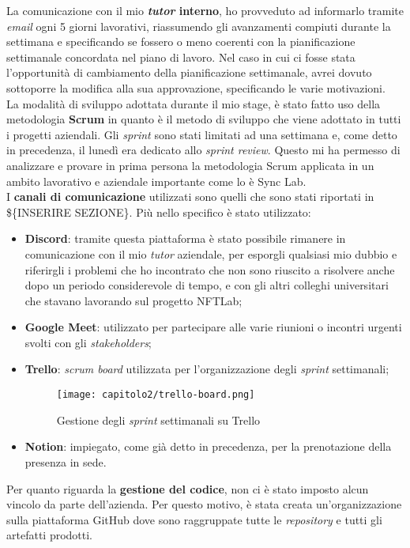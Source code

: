 La comunicazione con il mio \textbf{\emph{tutor} interno}, ho provveduto ad informarlo tramite \emph{email} ogni 5 giorni lavorativi, riassumendo gli avanzamenti compiuti durante la settimana e specificando se fossero o meno coerenti con la pianificazione settimanale concordata nel piano di lavoro. Nel caso in cui ci fosse stata l'opportunità di cambiamento della pianificazione settimanale, avrei dovuto sottoporre la modifica alla sua approvazione, specificando le varie motivazioni. \\

La modalità di sviluppo adottata durante il mio stage, è stato fatto uso della metodologia \textbf{Scrum} in quanto è il metodo di sviluppo che viene adottato in tutti i progetti aziendali. Gli \emph{sprint} sono stati limitati ad una settimana e, come detto in precedenza, il lunedì era dedicato allo \emph{sprint review}. Questo mi ha permesso di analizzare e provare in prima persona la metodologia Scrum applicata in un ambito lavorativo e aziendale importante come lo è Sync Lab. \\

I \textbf{canali di comunicazione} utilizzati sono quelli che sono stati riportati in \$\{INSERIRE SEZIONE\}. Più nello specifico è stato utilizzato:
\begin{itemize}
  \item \textbf{Discord}: tramite questa piattaforma è stato possibile rimanere in comunicazione con il mio \emph{tutor} aziendale, per esporgli qualsiasi mio dubbio e riferirgli i problemi che ho incontrato che non sono riuscito a risolvere anche dopo un periodo considerevole di tempo, e con gli altri colleghi universitari che stavano lavorando sul progetto NFTLab;
  \item \textbf{Google Meet}: utilizzato per partecipare alle varie riunioni o incontri urgenti svolti con gli \emph{stakeholders};
  \item \textbf{Trello}: \emph{scrum board} utilizzata per l'organizzazione degli \emph{sprint} settimanali;
  
  \begin{figure}[!h]
    \centering
    \texttt{[image: capitolo2/trello-board.png]}
    \caption{Gestione degli \emph{sprint} settimanali su Trello}
  \end{figure}

  \item \textbf{Notion}: impiegato, come già detto in precedenza, per la prenotazione della presenza in sede.
\end{itemize}

Per quanto riguarda la \textbf{gestione del codice}, non ci è stato imposto alcun vincolo da parte dell'azienda. Per questo motivo, è stata creata un'organizzazione sulla piattaforma GitHub dove sono raggruppate tutte le \emph{repository} e tutti gli artefatti prodotti.
